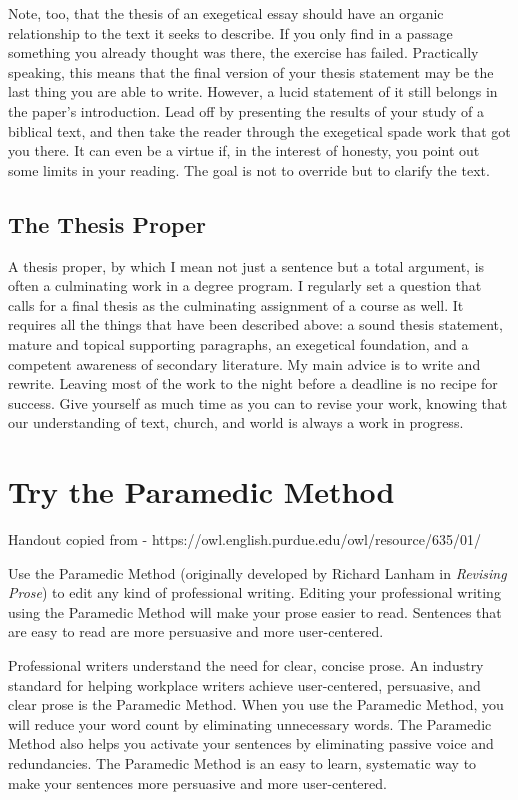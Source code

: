\documentclass[11pt]{article}
\begin{document}
Note, too, that the thesis of an exegetical essay should have an organic
relationship to the text it seeks to describe. If you only find in a
passage something you already thought was there, the exercise has
failed. Practically speaking, this means that the final version of your
thesis statement may be the last thing you are able to write. However, a
lucid statement of it still belongs in the paper's introduction. Lead
off by presenting the results of your study of a biblical text, and then
take the reader through the exegetical spade work that got you there. It
can even be a virtue if, in the interest of honesty, you point out some
limits in your reading. The goal is not to override but to clarify the
text.

\subsection{The Thesis Proper}

A thesis proper, by which I mean not just a sentence but a total
argument, is often a culminating work in a degree program. I regularly
set a question that calls for a final thesis as the culminating
assignment of a course as well. It requires all the things that have
been described above: a sound thesis statement, mature and topical
supporting paragraphs, an exegetical foundation, and a competent
awareness of secondary literature. My main advice is to write and
rewrite. Leaving most of the work to the night before a deadline is no
recipe for success. Give yourself as much time as you can to revise your
work, knowing that our understanding of text, church, and world is
always a work in progress.

\section{Try the Paramedic Method}


Handout copied from - https://owl.english.purdue.edu/owl/resource/635/01/

Use the Paramedic Method (originally developed by Richard Lanham in
\emph{Revising Prose}) to edit any kind of professional writing. Editing
your professional writing using the Paramedic Method will make your
prose easier to read. Sentences that are easy to read are more
persuasive and more user-centered.

Professional writers understand the need for clear, concise prose. An
industry standard for helping workplace writers achieve user-centered,
persuasive, and clear prose is the Paramedic Method. When you use the
Paramedic Method, you will reduce your word count by eliminating
unnecessary words. The Paramedic Method also helps you activate your
sentences by eliminating passive voice and redundancies. The Paramedic
Method is an easy to learn, systematic way to make your sentences more
persuasive and more user-centered.
\end{document}
